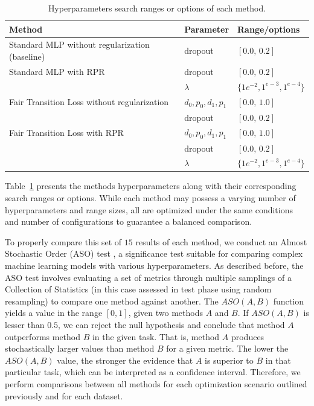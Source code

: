 \begin{table}[ht]
\centering
\caption{Hyperparameters search ranges or options of each method.}\label{tab:hyperparameters_rpr}
{\footnotesize
\begin{tabular}{lll}
\toprule
Method & Parameter & Range/options \\ \midrule
 Standard MLP without regularization (baseline) & dropout & $[0.0,\,0.2]$  \vspace{1ex} \\
 Standard MLP with RPR & dropout & $[0.0,\,0.2]$  \vspace{1ex} \\
 & $\lambda$ & $\{1e^{-2}, 1^{e-3}, 1^{e-4}\}$ \\
 Fair Transition Loss without regularization & $d_0,p_0,d_1,p_1$ & $[0.0,\,1.0]$ \\
 &  dropout & $[0.0,\,0.2]$ \\
 Fair Transition Loss with RPR & $d_0,p_0,d_1,p_1$ & $[0.0,\,1.0]$ \\
 &  dropout & $[0.0,\,0.2]$ \\
 & $\lambda$ & $\{1e^{-2}, 1^{e-3}, 1^{e-4}\}$ \\
\bottomrule
\end{tabular}
}
\end{table}

Table~\ref{tab:hyperparameters_rpr} presents the methods hyperparameters along with their corresponding search ranges or options. While each method may possess a varying number of hyperparameters and range sizes, all are optimized under the same conditions and number of configurations to guarantee a balanced comparison.

To properly compare this set of $15$ results of each method, we conduct an Almost Stochastic Order (ASO) test \citep{dror2019deep}, a significance test suitable for comparing complex machine learning models with various hyperparameters. As described before, the ASO test involves evaluating a set of metrics through multiple samplings of a Collection of Statistics (in this case assessed in test phase using random resampling) to compare one method against another. The $ASO(A, B)$ function yields a value in the range $[0, 1]$, given two methods $A$ and $B$. If $ASO(A, B)$ is lesser than $0.5$, we can reject the null hypothesis and conclude that method $A$ outperforms method $B$ in the given task. That is, method $A$ produces stochastically larger values than method $B$ for a given metric. The lower the $ASO(A, B)$ value, the stronger the evidence that $A$ is superior to $B$ in that particular task, which can be interpreted as a confidence interval. Therefore, we perform comparisons between all methods for each optimization scenario outlined previously and for each dataset.


